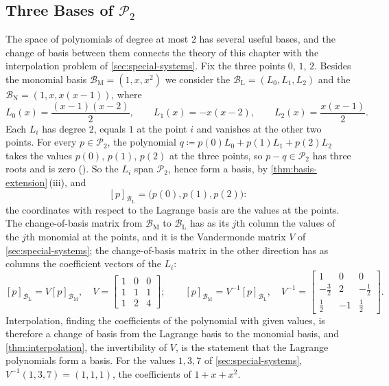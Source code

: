 \subsection{Three Bases of \texorpdfstring{$\mathcal P_2$}{P2}}

The space of polynomials of degree at most $2$ has several useful bases, and the change of basis between them connects the theory of this chapter with the interpolation problem of \cref{sec:special-systems}. Fix the three points $0$, $1$, $2$. Besides the monomial basis $\mathcal B_{\mathrm M}=(1,x,x^2)$ we consider the  $\mathcal B_{\mathrm L}=(L_0,L_1,L_2)$ and the  $\mathcal B_{\mathrm N}=(1,x,x(x-1))$, where
\[
L_0(x)=\frac{(x-1)(x-2)}2,\qquad L_1(x)=-x(x-2),\qquad L_2(x)=\frac{x(x-1)}2 .
\]
Each $L_i$ has degree $2$, equals $1$ at the point $i$ and vanishes at the other two points. For every $p\in\mathcal P_2$, the polynomial $q\coloneqq p(0)L_0+p(1)L_1+p(2)L_2$ takes the values $p(0)$, $p(1)$, $p(2)$ at the three points, so $p-q\in\mathcal P_2$ has three roots and is zero (). So the $L_i$ span $\mathcal P_2$, hence form a basis, by \cref{thm:basis-extension}\,(iii), and
\[
[p]_{\mathcal B_{\mathrm L}}=\bigl(p(0),p(1),p(2)\bigr):
\]
the coordinates with respect to the Lagrange basis are the values at the points. The change-of-basis matrix from $\mathcal B_{\mathrm M}$ to $\mathcal B_{\mathrm L}$ has as its $j$th column the values of the $j$th monomial at the points, and it is the Vandermonde matrix $V$ of \cref{sec:special-systems}; the change-of-basis matrix in the other direction has as columns the coefficient vectors of the $L_i$:
\[
[p]_{\mathcal B_{\mathrm L}}=V[p]_{\mathcal B_{\mathrm M}},\quad V=\begin{bmatrix}1&0&0\\1&1&1\\1&2&4\end{bmatrix};\qquad
[p]_{\mathcal B_{\mathrm M}}=V^{-1}[p]_{\mathcal B_{\mathrm L}},\quad V^{-1}=\begin{bmatrix}1&0&0\\-\frac32&2&-\frac12\\\frac12&-1&\frac12\end{bmatrix}.
\]
Interpolation, finding the coefficients of the polynomial with given values, is therefore a change of basis from the Lagrange basis to the monomial basis, and \cref{thm:interpolation}, the invertibility of $V$, is the statement that the Lagrange polynomials form a basis. For the values $1,3,7$ of \cref{sec:special-systems}, $V^{-1}(1,3,7)=(1,1,1)$, the coefficients of $1+x+x^2$.

